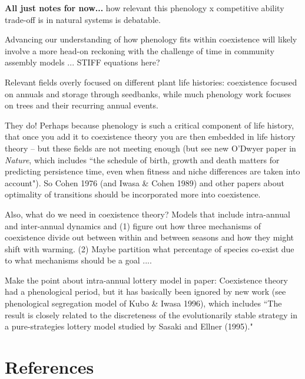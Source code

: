 \documentclass[11pt]{article}
\begin{document}
{\bf All just notes for now...}
 how relevant this phenology x competitive ability  trade-off is in natural systems is debatable. 
 
 Advancing our understanding of how phenology fits within coexistence will likely involve a more head-on reckoning with the challenge of time in community assembly models ... STIFF equations here? 


Relevant fields overly focused on different plant life histories: coexistence focused on annuals and storage through seedbanks, while much phenology work focuses on trees and their recurring annual events. 

They do! Perhaps because phenology is such a critical component of life history, that once you add it to coexistence theory you are then embedded in life history theory -- but these fields are not meeting enough (but see new O'Dwyer paper in \emph{Nature}, which includes ``the schedule of birth, growth and death matters for predicting persistence time, even when fitness and niche differences are taken into account"). So Cohen 1976 (and Iwasa \& Cohen 1989) and other papers about optimality of transitions should be incorporated more into coexistence. 

Also, what do we need in coexistence theory? Models that include intra-annual and inter-annual dynamics and (1) figure out how three mechanisms of coexistence divide out between within and between seasons and how they might shift with warming. (2) Maybe partition what percentage of species co-exist due to what mechanisms should be a goal .... 

Make the point about intra-annual lottery model in paper: Coexistence theory had a phenological period, but it has basically been ignored by new work (see phenological segregation model of Kubo \& Iwasa 1996), which includes ``The result is closely related to the discreteness of the evolutionarily stable strategy in a pure-strategies lottery model studied by Sasaki and Ellner (1995)." 

\newpage
\section{References}

\end{document}
